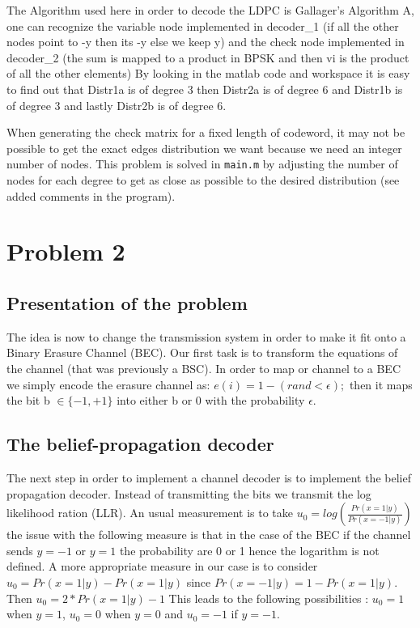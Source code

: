 \documentclass[a4paper]{article}
\begin{document}
The Algorithm used here in order to decode the LDPC is Gallager's Algorithm A, one can recognize the variable node implemented in decoder\_1 (if all the other nodes point to -y then its -y else we keep y) and the check node implemented in decoder\_2 (the sum is mapped to a product in BPSK and then vi is the product of all the other elements)
By looking in the matlab code and workspace it is easy to find out that Distr1a is of degree 3 then Distr2a is of degree 6 and Distr1b is of degree 3 and lastly Distr2b is of degree 6.

When generating the check matrix for a fixed length of codeword, it may not be possible to get the exact edges distribution we want because we need an integer number of nodes. This problem is solved in \verb|main.m| by adjusting the number of nodes for each degree to get as close as possible to the desired distribution (see added comments in the program).

\section{Problem 2}
\subsection{Presentation of the problem}
The idea is now to change the transmission system in order to make it fit onto a Binary Erasure Channel (BEC). Our first task is to transform the equations of the channel (that was previously a BSC). In order to map or channel to a BEC we simply encode the erasure channel as:  $e(i)= 1-(rand<\epsilon);$ then it maps the bit b $\in \{-1,+1\}$ into either b or 0 with the probability $\epsilon$.

\subsection{The belief-propagation decoder }

The next step in order to implement a channel decoder is to implement the belief propagation decoder. Instead of transmitting the bits we transmit the log likelihood ration (LLR).
An usual measurement is to take $u_0= log( \frac{Pr(x=1|y)}{Pr(x=-1|y)})$ the issue with the following measure is that in the case of the BEC if the channel sends $y=-1 $ or $y=1$ the probability are 0 or 1 hence the logarithm is not defined. A more appropriate measure in our case  is to consider $u_0= Pr(x=1|y)-Pr(x=1|y)$ since $Pr(x=-1|y)=1-Pr(x=1|y)$. Then $u_0=2*Pr(x=1|y)-1$
This leads to the following possibilities : $u_0=1$ when $y=1$, $u_0=0$ when $y=0$ and $u_0=-1$ if $y=-1$.
\end{document}
